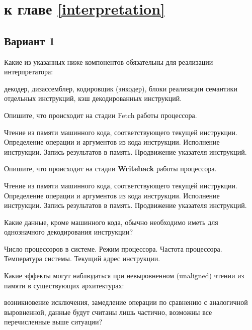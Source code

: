 \section{\Questions к главе \ref{interpretation}} %

\subsection*{Вариант 1}

\begin{questions}
\question[1] Какие из указанных ниже компонентов обязательны для реализации интерпретатора:
\begin{choices}
    \correctchoice декодер,
    \choice дизассемблер,
    \choice кодировщик (энкодер),
    \correctchoice блоки реализации семантики отдельных инструкций,
    \choice кэш декодированных инструкций.
\end{choices}

\question[3] Опишите, что происходит на стадии Fetch работы процессора.
\begin{choices}
    \correctchoice Чтение из памяти машинного кода, соответствующего текущей инструкции.
    \choice Определение операции и аргументов из кода инструкции.
    \choice Исполнение инструкции.
    \choice Запись результатов в память.
    \choice Продвижение указателя инструкций.
\end{choices}

\question[3] Опишите, что происходит на стадии \textbf{Writeback} работы процессора. %
\begin{choices}
    \choice Чтение из памяти машинного кода, соответствующего текущей инструкции.
    \choice Определение операции и аргументов из кода инструкции.
    \choice Исполнение инструкции.
    \correctchoice Запись результатов в память.
    \choice Продвижение указателя инструкций.
\end{choices}

\question[3] Какие данные, кроме машинного кода, обычно необходимо иметь для однозначного декодирования инструкции?
\begin{choices}
    \choice Число процессоров в системе.
    \correctchoice Режим процессора.
    \choice Частота процессора.
    \choice Температура системы.
    \correctchoice Текущий адрес инструкции.
\end{choices}

\question[1] Какие эффекты могут наблюдаться при невыровненном (unaligned) чтении из памяти в существующих архитектурах:
\begin{choices}
    \correctchoice возникновение исключения,
    \correctchoice     замедление операции по сравнению с аналогичной выровненной,
    \choice данные будут считаны лишь частично,
    \choice  возможны все перечисленные выше ситуации?
\end{choices}


\end{questions}
